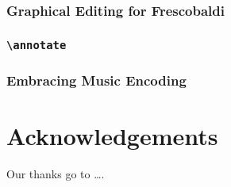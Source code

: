 \documentclass[11pt,a4paper]{article}
\begin{document}
\subsubsection{Graphical Editing for Frescobaldi}

\subsubsection{\texttt{\textbackslash annotate}}

\subsubsection{Embracing Music Encoding}



\section{Acknowledgements}

Our thanks go to \ldots .
\end{document}
